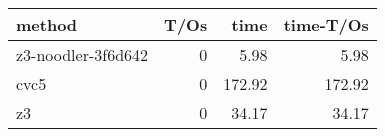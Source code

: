 \begin{tabular}{lrrr}
\hline
 method             &   T/Os &   time &   time-T/Os \\
\hline
 z3-noodler-3f6d642 &      0 &   5.98 &        5.98 \\
 cvc5               &      0 & 172.92 &      172.92 \\
 z3                 &      0 &  34.17 &       34.17 \\
\hline
\end{tabular}
